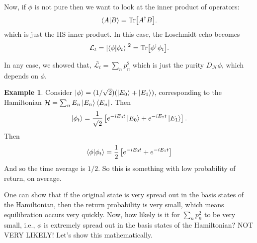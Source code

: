 \documentclass{book}
\theoremstyle{definition}
\newtheorem{exmp}{Example}[section]
\newcommand{\lag}{\mathcal{L}}
\newcommand{\had}{\mathcal{H}}
\newcommand{\f}[2]{\frac{#1}{#2}}
\newcommand{\lb}{\left[}
\newcommand{\rb}{\right]}
\begin{document}
Now, if $\phi$ is not pure then we want to look at the inner product of operators:
\begin{align}
\braket{A}{B} = \Tr[A^\dagger B].
\end{align}
which is just the HS inner product. In this case, the Loschmidt echo becomes
\begin{align}
\lag_t = \abs{\braket{\phi}{\phi_t}}^2 = \Tr[\phi^\dagger \phi_t]. 
\end{align} 

In any case, we showed that, $\bar{\lag_t} = \sum_n p_n^2$ which is just the purity $D_\had \phi$, which depends on $\phi$. 

\begin{exmp}
	Consider $\ket{\phi} = (1/\sqrt{2})(\ket{E_0} + \ket{E_1})$, corresponding to the Hamiltonian $\had = \sum_n E_n \ket{E_n}\bra{E_n}$. Then 
	\begin{align}
	\ket{\phi_t} = \f{1}{\sqrt{2}}\lb e^{-iE_0t}\ket{E_0} + e^{-iE_2t}\ket{E_1} \rb.
	\end{align}
	Then 
	\begin{align}
	\braket{\phi}{\phi_t} = \f{1}{2}\lb e^{-iE_0 t}  + e^{-iE_1t}\rb
	\end{align}
	And so the time average is $1/2$. So this is something with low probability of return, on average.  
\end{exmp}


One can show that if the original state is very spread out in the basis states of the Hamiltonian, then the return probability is very small, which means equilibration occurs very quickly. Now, how likely is it for $\sum_n p_n^2$ to be very small, i.e., $\phi$ is extremely spread out in the basis states of the Hamiltonian? NOT VERY LIKELY! Let's show this mathematically. \\
\end{document}
